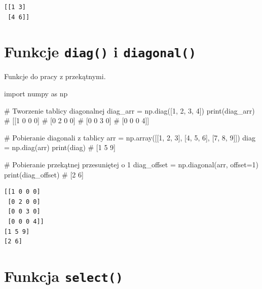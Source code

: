 \documentclass[
  letterpaper,
  DIV=11,
  numbers=noendperiod]{scrreprt}
\newenvironment{Shaded}{\begin{snugshade}}{\end{snugshade}}
\newcommand{\BuiltInTok}[1]{\textcolor[rgb]{0.00,0.23,0.31}{#1}}
\newcommand{\CommentTok}[1]{\textcolor[rgb]{0.37,0.37,0.37}{#1}}
\newcommand{\DecValTok}[1]{\textcolor[rgb]{0.68,0.00,0.00}{#1}}
\newcommand{\ImportTok}[1]{\textcolor[rgb]{0.00,0.46,0.62}{#1}}
\newcommand{\NormalTok}[1]{\textcolor[rgb]{0.00,0.23,0.31}{#1}}
\newcommand{\OperatorTok}[1]{\textcolor[rgb]{0.37,0.37,0.37}{#1}}
\begin{document}
\begin{verbatim}
[[1 3]
 [4 6]]
\end{verbatim}

\section{\texorpdfstring{Funkcje \texttt{diag()} i
\texttt{diagonal()}}{Funkcje diag() i diagonal()}}\label{funkcje-diag-i-diagonal}

Funkcje do pracy z przekątnymi.

\begin{Shaded}
\begin{Highlighting}[]
\ImportTok{import}\NormalTok{ numpy }\ImportTok{as}\NormalTok{ np}

\CommentTok{\# Tworzenie tablicy diagonalnej}
\NormalTok{diag\_arr }\OperatorTok{=}\NormalTok{ np.diag([}\DecValTok{1}\NormalTok{, }\DecValTok{2}\NormalTok{, }\DecValTok{3}\NormalTok{, }\DecValTok{4}\NormalTok{])}
\BuiltInTok{print}\NormalTok{(diag\_arr)}
\CommentTok{\# [[1 0 0 0]}
\CommentTok{\#  [0 2 0 0]}
\CommentTok{\#  [0 0 3 0]}
\CommentTok{\#  [0 0 0 4]]}

\CommentTok{\# Pobieranie diagonali z tablicy}
\NormalTok{arr }\OperatorTok{=}\NormalTok{ np.array([[}\DecValTok{1}\NormalTok{, }\DecValTok{2}\NormalTok{, }\DecValTok{3}\NormalTok{], [}\DecValTok{4}\NormalTok{, }\DecValTok{5}\NormalTok{, }\DecValTok{6}\NormalTok{], [}\DecValTok{7}\NormalTok{, }\DecValTok{8}\NormalTok{, }\DecValTok{9}\NormalTok{]])}
\NormalTok{diag }\OperatorTok{=}\NormalTok{ np.diag(arr)}
\BuiltInTok{print}\NormalTok{(diag)  }\CommentTok{\# [1 5 9]}

\CommentTok{\# Pobieranie przekątnej przesuniętej o 1}
\NormalTok{diag\_offset }\OperatorTok{=}\NormalTok{ np.diagonal(arr, offset}\OperatorTok{=}\DecValTok{1}\NormalTok{)}
\BuiltInTok{print}\NormalTok{(diag\_offset)  }\CommentTok{\# [2 6]}
\end{Highlighting}
\end{Shaded}

\begin{verbatim}
[[1 0 0 0]
 [0 2 0 0]
 [0 0 3 0]
 [0 0 0 4]]
[1 5 9]
[2 6]
\end{verbatim}

\section{\texorpdfstring{Funkcja
\texttt{select()}}{Funkcja select()}}\label{funkcja-select}
\end{document}
